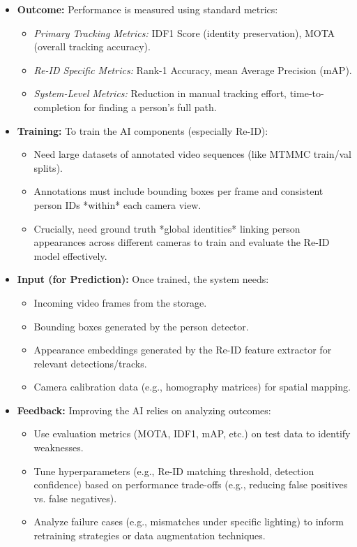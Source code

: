 \begin{itemize}
    \item \textbf{Outcome:} Performance is measured using standard metrics:
        \begin{itemize}
            \item \textit{Primary Tracking Metrics:} IDF1 Score (identity preservation), MOTA (overall tracking accuracy).
            \item \textit{Re-ID Specific Metrics:} Rank-1 Accuracy, mean Average Precision (mAP).
            \item \textit{System-Level Metrics:} Reduction in manual tracking effort, time-to-completion for finding a person's full path.
        \end{itemize}

    \item \textbf{Training:} To train the AI components (especially Re-ID):
        \begin{itemize}
            \item Need large datasets of annotated video sequences (like MTMMC train/val splits).
            \item Annotations must include bounding boxes per frame and consistent person IDs *within* each camera view.
            \item Crucially, need ground truth *global identities* linking person appearances across different cameras to train and evaluate the Re-ID model effectively.
        \end{itemize}

    \item \textbf{Input (for Prediction):} Once trained, the system needs:
        \begin{itemize}
            \item Incoming video frames from the storage.
            \item Bounding boxes generated by the person detector.
            \item Appearance embeddings generated by the Re-ID feature extractor for relevant detections/tracks.
            \item Camera calibration data (e.g., homography matrices) for spatial mapping.
        \end{itemize}

    \item \textbf{Feedback:} Improving the AI relies on analyzing outcomes:
        \begin{itemize}
            \item Use evaluation metrics (MOTA, IDF1, mAP, etc.) on test data to identify weaknesses.
            \item Tune hyperparameters (e.g., Re-ID matching threshold, detection confidence) based on performance trade-offs (e.g., reducing false positives vs. false negatives).
            \item Analyze failure cases (e.g., mismatches under specific lighting) to inform retraining strategies or data augmentation techniques.
        \end{itemize}


\end{itemize}
